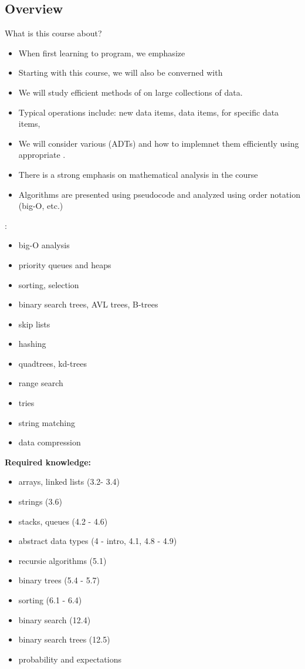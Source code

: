\documentclass[letterpaper, 12pt]{article}
\newcommand{\red}[1]{{\color{red}{#1}}}
\begin{document}
    \subsection{Overview}
    What is this course about?
    \begin{itemize}
        \item When first learning to program, we emphasize \red{correctness}
        \item Starting with this course, we will also be converned with \red{efficiency}
        \item We will study efficient methods of \red{storing, accessing, and performing operations} on large collections of data.
        \item Typical operations include: \red{inserting} new data items, \red{deleting} data items, \red{searching} for specific data items, \red{sorting}\\
        \item We will consider various \red{abstract data types} (ADTs) and how to implemnet them efficiently using appropriate \red{data structures}.
        \item There is a strong emphasis on mathematical analysis in the course
        \item Algorithms are presented using pseudocode and analyzed using order notation (big-O, etc.)
    \end{itemize}
    \bigskip
    \textbf{\red{Course Topics}}:
    \begin{itemize}
        \item big-O analysis
        \item priority queues and heaps
        \item sorting, selection
        \item binary search trees, AVL trees, B-trees
        \item skip lists
        \item hashing
        \item quadtrees, kd-trees
        \item range search
        \item tries
        \item string matching
        \item data compression
    \end{itemize}
    \pagebreak
    \textbf{Required knowledge:}
    \begin{itemize}
        \item arrays, linked lists (3.2- 3.4)
        \item strings (3.6)
        \item stacks, queues (4.2 - 4.6)
        \item abstract data types (4 - intro, 4.1, 4.8 - 4.9)
        \item recursie algorithms (5.1)
        \item binary trees (5.4 - 5.7)
        \item sorting (6.1 - 6.4)
        \item binary search (12.4)
        \item binary search trees (12.5)
        \item probability and expectations
    \end{itemize}
    \pagebreak
\end{document}
